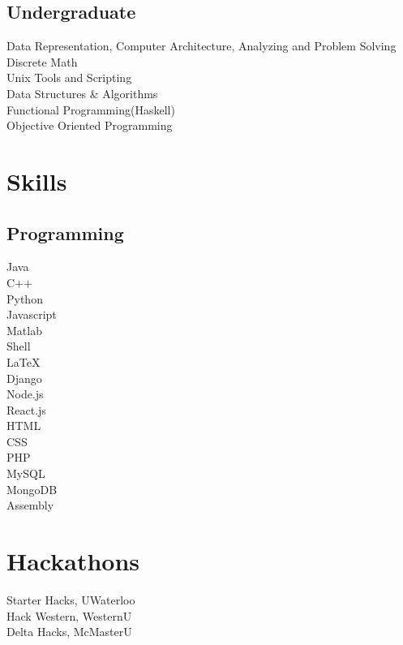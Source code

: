\documentclass[]{deedy-resume-openfont}
\begin{document}
\begin{minipage}[t]{0.33\textwidth}
\smallskip
\subsection{Undergraduate}
Data Representation, Computer Architecture, Analyzing and Problem Solving \\
Discrete Math\\
Unix Tools and Scripting \\
Data Structures \& Algorithms\\
Functional Programming(Haskell) \\
Objective Oriented Programming\\


\sectionsep





\section{\color{red} Skills }
\smallskip
\subsection{Programming}
\smallskip
{}
\smallskip
\textbullet{} Java   \\ \textbullet{} C++ \\  \textbullet{} Python \\ \textbullet{} Javascript \\
\textbullet{} Matlab \\ \textbullet{} Shell \\ \textbullet{} \LaTeX\ \\ 
\textbullet{} Django \\ 
\textbullet{} Node.js \\ 
\textbullet{} React.js \\ 
\textbullet{} HTML \\ 
\textbullet{} CSS \\
\textbullet{} PHP\\
\textbullet{} MySQL \\ 
\textbullet{} MongoDB \\ 
\textbullet{} Assembly \\


\sectionsep
\section{\color{red} Hackathons }
\textbullet{} Starter Hacks, UWaterloo \\
\textbullet{} Hack Western, WesternU \\
\textbullet{} Delta Hacks, McMasterU \\


%
%

\end{minipage} 
\end{document}
